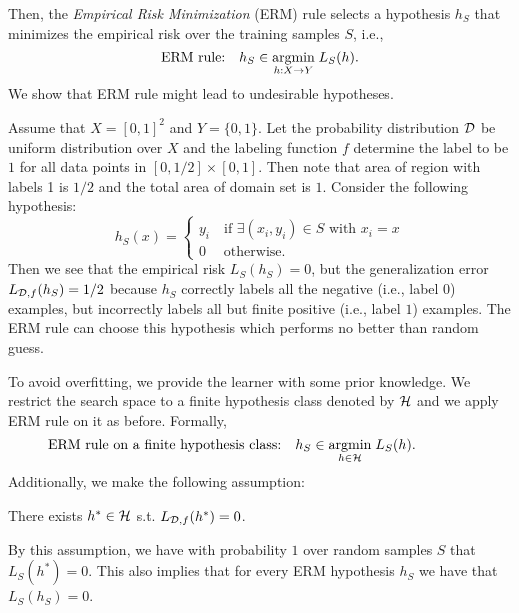 \documentclass[11pt,a4paper]{article}
\begin{document}
\noindent Then, the \textit{Empirical Risk Minimization} (ERM) rule selects a hypothesis $h_S$ that minimizes the empirical risk over the training samples $S$, i.e.,
\begin{equation*}
\text{ERM rule:}\quad h_S \in \underset{h:X\rightarrow Y}{\text{argmin}}\; L_S(h).
\end{equation*}
We show that ERM rule might lead to undesirable hypotheses. 

\begin{remark}[{Overfitting}]
Assume that $X = [0,1]^2$ and $Y = \{0,1\}$. Let the probability distribution $\mathcal{D}$ be uniform distribution over $X$ and the labeling function $f$ determine the label to be $1$ for all data points in $[0,1/2]\times [0,1]$. Then note that area of region with labels 1 is $1/2$ and the total area of domain set is $1$. Consider the following hypothesis:
\begin{equation*}
h_S(x) = 
\begin{cases}
y_i\quad\text{if }\exists (x_i,y_i)\in S\text{ with } x_i = x\\
0  \quad \;\text{otherwise.}
\end{cases}
\end{equation*}
Then we see that the empirical risk $L_S(h_S) = 0$, but the generalization error $L_{\mathcal{D}, f}(h_S) = 1/2$ because $h_S$ correctly labels all the negative (i.e., label $0$) examples, but incorrectly labels all but finite positive (i.e., label $1$) examples. The ERM rule can choose this hypothesis which performs no better than random guess.
\end{remark}

To avoid overfitting, we provide the learner with some prior knowledge. We restrict the search space to a finite hypothesis class denoted by $\mathcal{H}$ and we apply ERM rule on it as before. Formally, 
\begin{equation*}
    \text{ERM rule on a finite hypothesis class:}\quad h_S \in \underset{h\in \mathcal{H}}{\text{argmin}}\; L_S(h).\qquad \qquad
\end{equation*}
Additionally, we make the following assumption:

\begin{assume}
There exists $h^*\in \mathcal{H}$ s.t. $L_{\mathcal{D}, f}(h^*) = 0$.
\end{assume}

By this assumption, we have with probability $1$ over random samples $S$ that $L_S(h^*) = 0$. This also implies that for every ERM hypothesis $h_S$ we have that $L_S(h_S) = 0$.
\end{document}
